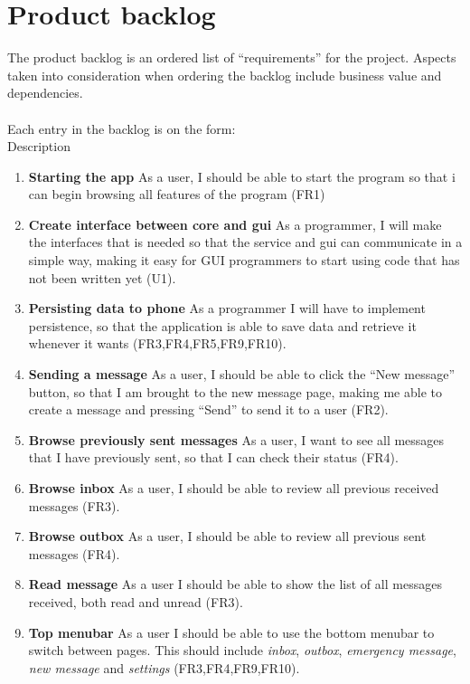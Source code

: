 \chapter{Product backlog}
The product backlog is an ordered list of ``requirements'' for the project. Aspects taken into consideration when ordering the backlog include business value and dependencies.\\\\
		Each entry in the backlog is on the form:\\
			 {Description}
		
		\begin{enumerate}
			\item {\bf Starting the app} As a user, I should be able to start the program so that i can begin browsing all features of the program (FR1)
			\item {\bf Create interface between core and gui} As a programmer, I will make the interfaces that is needed so that the service and gui can communicate in a simple way, making it easy for GUI programmers to start using code that has not been written yet (U1).
			\item {\bf Persisting data to phone} As a programmer I will have to implement persistence, so that the application is able to save data and retrieve it whenever it wants (FR3,FR4,FR5,FR9,FR10).
			\item {\bf Sending a message} As a user, I should be able to click the ``New message'' button, so that I am brought to the new message page, making me able to create a message and pressing ``Send'' to send it to a user (FR2).
			\item {\bf Browse previously sent messages} As a user, I want to see all messages that I have previously sent, so that I can check their status (FR4). 
			\item {\bf Browse inbox} As a user, I should be able to review all previous received messages (FR3).
			\item {\bf Browse outbox} As a user, I should be able to review all previous sent messages (FR4).
			\item {\bf{Read message}} As a user I should be able to show the list of all messages received, both read and unread (FR3).
			\item {\bf Top menubar} As a user I should be able to use the bottom menubar to switch between pages. This should include {\it inbox}, {\it outbox}, {\it emergency message}, {\it new message} and {\it settings} (FR3,FR4,FR9,FR10).

\end{enumerate}

